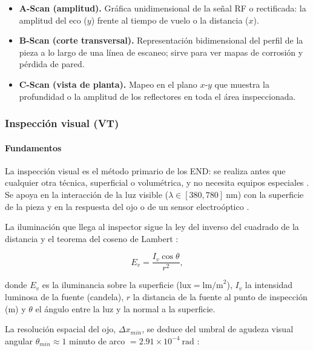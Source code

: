 \begin{itemize}
  \item \textbf{A-Scan (amplitud).} Gráfica unidimensional de la señal RF o
        rectificada: la amplitud del eco ($y$) frente al tiempo de vuelo o la
        distancia ($x$).
  \item \textbf{B-Scan (corte transversal).} Representación bidimensional del perfil
        de la pieza a lo largo de una línea de escaneo; sirve para ver mapas de
        corrosión y pérdida de pared.
  \item \textbf{C-Scan (vista de planta).} Mapeo en el plano $x$-$y$ que muestra la
        profundidad o la amplitud de los reflectores en toda el área inspeccionada.
\end{itemize}

\subsubsection{Inspección visual (VT)}
\label{sec:vt}

\paragraph{Fundamentos}

La inspección visual es el método primario de los END: se realiza antes que cualquier
otra técnica, superficial o volumétrica, y no necesita equipos especiales
\parencite{asme_bpvc_v_art9, iso17637}. Se apoya en la interacción de la luz visible
($\lambda \in [380,780]\ \text{nm}$) con la superficie de la pieza y en la respuesta
del ojo o de un sensor electroóptico \parencite{moore2012}.

La iluminación que llega al inspector sigue la ley del inverso del cuadrado de la
distancia y el teorema del coseno de Lambert \parencite{cheeke2017}:

\begin{equation}
  E_v = \frac{I_v \cos\theta}{r^2},
  \label{eq:iluminancia-lambert}
\end{equation}

donde $E_v$ es la iluminancia sobre la superficie ($\text{lux} = \text{lm/m}^2$),
$I_v$ la intensidad luminosa de la fuente (candela), $r$ la distancia de la fuente al
punto de inspección (m) y $\theta$ el ángulo entre la luz y la normal a la superficie.

La resolución espacial del ojo, $\Delta x_{min}$, se deduce del umbral de agudeza
visual angular $\theta_{min}\approx 1$ minuto de arco $= 2.91\times10^{-4}\ \text{rad}$
\parencite{moore2012}:

